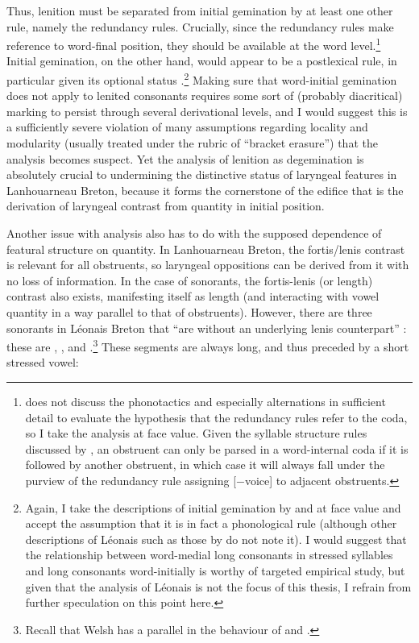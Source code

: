 Thus, lenition must be separated from initial gemination by at least one other rule, namely the redundancy rules. Crucially, since the redundancy rules make reference to word\hyp final position, they should be available at the word level.\footnote{\citet{carlyle88:_breton} does not discuss the phonotactics and especially alternations in sufficient detail to evaluate the hypothesis that the redundancy rules refer to the coda, so I take the analysis at face value. Given the syllable structure rules discussed by \citet[ch.~3]{carlyle88:_breton}, an obstruent can only be parsed in a word\hyp internal coda if it is followed by another obstruent, in which case it will always fall under the purview of the redundancy rule assigning [$-$voice] to adjacent obstruents.} Initial gemination, on the other hand, would appear to be a postlexical rule, in particular given its optional status \citep[\egm][]{kiparsky85:_some_lexic_phonol}.\footnote{Again, I take the descriptions of initial gemination by \citet{falchun} and \citet{carlyle88:_breton} at face value and accept the assumption that it is in fact a phonological rule (although other descriptions of Léonais such as those by \citealt{sommerfelt62:_notes_dourd_plouez_finis,st-pol-de-leon} do not note it). I would suggest that the relationship between word\hyp medial long consonants in stressed syllables and long consonants word\hyp initially is worthy of targeted empirical study, but given that the analysis of Léonais is not the focus of this thesis, I refrain from further speculation on this point here.} Making sure that word\hyp initial gemination does not apply to lenited consonants requires some sort of (probably diacritical) marking to persist through several derivational levels, and I would suggest this is a sufficiently severe violation of many assumptions regarding locality and modularity (usually treated under the rubric of \enquote{bracket erasure}) that the analysis becomes suspect. Yet the analysis of lenition as degemination is absolutely crucial to undermining the distinctive status of laryngeal features in Lanhouarneau Breton, because it forms the cornerstone of the edifice that is the derivation of laryngeal contrast from quantity in initial position.

Another issue with  analysis also has to do with the supposed dependence of featural structure on quantity. In Lanhouarneau Breton, the fortis\fshyp lenis contrast is relevant for all obstruents, so laryngeal oppositions can be derived from it with no loss of information. In the case of sonorants, the fortis\hyp lenis (or length) contrast also exists, manifesting itself as length (and interacting with vowel quantity in a way parallel to that of obstruents). However, there are three sonorants in Léonais Breton that \enquote{are without an underlying lenis counterpart} \citep[p.~34]{carlyle88:_breton}: these are \ipa{[m]}, \ipa{[ɲ]}, and \ipa{[ʎ]}.\footnote{Recall that Welsh has a parallel in the behaviour of \ipa{[m]} and \ipa{[ŋ]}.} These segments are always long, and thus preceded by a short stressed vowel:

